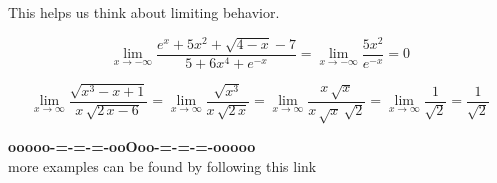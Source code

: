 \documentclass{ximera}
\begin{document}
This helps us think about limiting behavior.



\begin{example}


\[
\lim\limits_{x \to -\infty} \frac{e^{x} + 5x^2 + \sqrt{4-x} - 7}{5 + 6x^4 + e^{-x}} = \lim\limits_{x \to -\infty} \frac{5x^2}{e^{-x}} = 0
\]



\end{example}







\begin{example}


\[
\lim\limits_{x \to \infty} \frac{\sqrt{x^3 - x + 1}}{x \, \sqrt{2 \, x-6}} = \lim\limits_{x \to \infty} \frac{\sqrt{x^3}}{x \, \sqrt{2 \, x}} = \lim\limits_{x \to \infty} \frac{x \, \sqrt{x}}{x \, \sqrt{x} \, \sqrt{2} } = \lim\limits_{x \to \infty} \frac{1}{\sqrt{2} } = \frac{1}{\sqrt{2} }
\]



\end{example}













\begin{center}
\textbf{\textcolor{green!50!black}{ooooo-=-=-=-ooOoo-=-=-=-ooooo}} \\

more examples can be found by following this link\\ 

\end{center}
\end{document}
